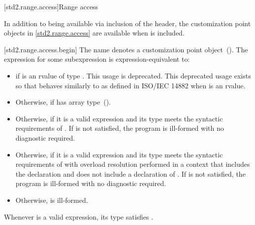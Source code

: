 [std2.range.access]{Range access}

\pnum
In addition to being available via inclusion of the 
header, the customization point objects in \ref{std2.range.access} are
available when  is included.

[std2.range.access.begin]{}
\pnum
The name  denotes a customization point
 object~(). The expression
 for some subexpression  is expression-equivalent to:

\begin{itemize}
\item
   if  is an rvalue of
  type . This usage is deprecated.
  \enternote This deprecated usage exists so that
   behaves similarly to 
  as defined in ISO/IEC 14882 when  is an rvalue. \exitnote

\item
  Otherwise,  if  has array
  type~().

\item
  Otherwise,  if it is a valid expression and its type  meets the
  syntactic requirements of . If
   is not satisfied, the program is ill-formed
  with no diagnostic required.

\item
  Otherwise,  if it is a valid expression and its type  meets the
  syntactic requirements of  with overload
  resolution performed in a context that includes the declaration
   and does not include
  a declaration of . If 
  is not satisfied, the program is ill-formed with no diagnostic
  required.

\item
  Otherwise,  is ill-formed.
\end{itemize}

\pnum
\enternote Whenever  is a valid expression, its
type satisfies . \exitnote

